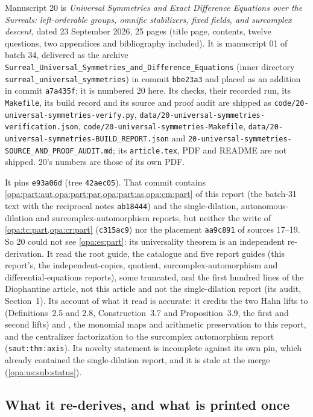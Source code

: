 \documentclass[11pt,oneside]{article}
\numberwithin{equation}{section}
\theoremstyle{definition}
\theoremstyle{remark}
\newcommand{\lbl}[1]{\nolinkurl{#1}}
\newcommand{\fn}[1]{\nolinkurl{#1}}
\begin{document}
Manuscript 20 is \emph{Universal Symmetries and Exact Difference Equations over the Surreals: left-orderable groups, omnific
stabilizers, fixed fields, and surcomplex descent}, dated 23 September 2026, 25 pages (title page, contents, twelve questions,
two appendices and bibliography included). It is manuscript 01 of batch 34, delivered as the archive
\fn{Surreal_Universal_Symmetries_and_Difference_Equations} (inner directory \fn{surreal_universal_symmetries}) in commit
\texttt{bbe23a3} and placed as an addition in commit \texttt{a7a435f}; it is numbered 20 here. Its checks, their recorded run, its
\fn{Makefile}, its build record and its source and proof audit are shipped as \fn{code/20-universal-symmetries-verify.py},
\fn{data/20-universal-symmetries-verification.json}, \fn{code/20-universal-symmetries-Makefile},
\fn{data/20-universal-symmetries-BUILD_REPORT.json} and \fn{20-universal-symmetries-SOURCE_AND_PROOF_AUDIT.md}; its
\fn{article.tex}, PDF and README are not shipped. 20's numbers are those of its own PDF.

It pins \texttt{e93a06d} (tree \texttt{42aec05}). That commit contains \cref{opa:part:aut,opa:part:par,opa:part:as,opa:cm:part}
of this report (the batch-31 text with the reciprocal notes \texttt{ab18444}) and the single-dilation, autonomous-dilation and
surcomplex-automorphism reports, but neither the write of \cref{opa:tc:part,opa:cr:part} (\texttt{c315ac9}) nor the placement
\texttt{aa9c891} of sources 17--19. So 20 could not see \cref{opa:es:part}: its universality theorem is an independent
re-derivation. It read the root guide, the catalogue and five report guides (this report's, the independent-copies, quotient,
surcomplex-automorphism and differential-equations reports), some truncated, and the first hundred lines of the Diophantine article,
not this article and not the single-dilation report (its audit, Section~1). Its account of what it read is accurate: it credits
the two Hahn lifts to \cite{KKS} (Definitions~2.5 and 2.8, Construction~3.7 and Proposition~3.9, the first and second lifts) and
\cite{KSgroups}, the monomial maps and arithmetic preservation to this report, and the centralizer factorization to the surcomplex
automorphism report (\lbl{saut:thm:axis}). Its novelty statement is incomplete against its own pin, which already contained the
single-dilation report, and it is stale at the merge (\cref{opa:us:sub:status}).

\subsection{What it re-derives, and what is printed once}\label{opa:us:sub:once}
\end{document}

